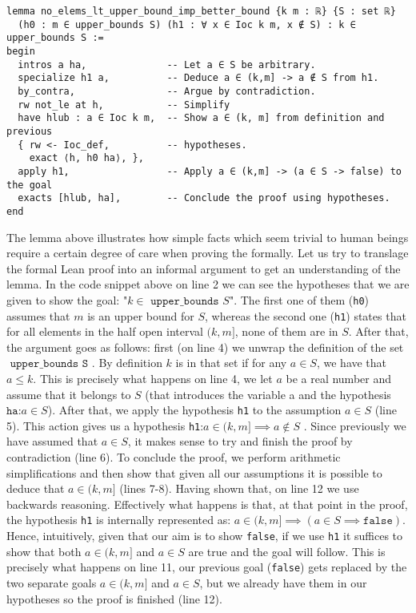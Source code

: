 \documentclass[11pt]{article}
\begin{document}
\begin{verbatim}
lemma no_elems_lt_upper_bound_imp_better_bound {k m : ℝ} {S : set ℝ}
  (h0 : m ∈ upper_bounds S) (h1 : ∀ x ∈ Ioc k m, x ∉ S) : k ∈ upper_bounds S :=
begin
  intros a ha,              -- Let a ∈ S be arbitrary.
  specialize h1 a,          -- Deduce a ∈ (k,m] -> a ∉ S from h1.
  by_contra,                -- Argue by contradiction.
  rw not_le at h,           -- Simplify
  have hlub : a ∈ Ioc k m,  -- Show a ∈ (k, m] from definition and previous
  { rw <- Ioc_def,          -- hypotheses.
    exact ⟨h, h0 ha⟩, },
  apply h1,                 -- Apply a ∈ (k,m] -> (a ∈ S -> false) to the goal
  exacts [hlub, ha],        -- Conclude the proof using hypotheses.
end
\end{verbatim}
The lemma above illustrates how simple facts which seem trivial to human beings
require a certain degree of care when proving the formally. Let us try to
translage the formal Lean proof into an informal argument to get an
understanding of the lemma. In the code snippet above on line 2 we can see the
hypotheses that we are given to show the goal: "$k \in \texttt{ upper\_bounds }
S$". The first one of them (\texttt{h0}) assumes that  $m$ is an upper bound
for  $S$, whereas the second one (\texttt{h1}) states that for all elements in
the half open interval $(k, m]$, none of them are in  $S$. After that, the
argument goes as follows: first (on line 4) we unwrap the definition of the set
$\texttt{ upper\_bounds S }$. By definition $k$ is in that set if for any $a
\in S$, we have that  $a \le k$. This is precisely what happens on line 4, we
let  $a$ be a real number and assume that it belongs to  $S$ (that introduces
the variable a and the hypothesis  $\texttt{ha:} a \in S$). After that, we
apply the hypothesis \texttt{h1} to the assumption $a \in S$ (line 5). This
action gives us a hypothesis \texttt{h1}:$ a \in (k,m] \implies a \not\in S$ .
Since previously we have assumed that $a \in S$, it makes sense to try and
finish the proof by contradiction (line 6). To conclude the proof, we perform
arithmetic simplifications and then show that given all our assumptions it is
possible to deduce that $ a \in (k, m]$ (lines 7-8). Having shown that, on line
12 we use backwards reasoning. Effectively what happens is that, at that point
in the proof, the hypothesis \texttt{h1} is internally represented as: $ a \in
(k,m] \implies (a \in S \implies \texttt{false}) $. Hence, intuitively, given
that our aim is to show \texttt{false}, if we use \texttt{h1} it suffices to
show that both $ a \in (k,m] $ and $a \in S$ are true and the goal will follow.
This is precisely what happens on line 11, our previous goal (\texttt{false})
gets replaced by the two separate goals $ a \in (k,m] $ and $a \in S$, but we
already have them in our hypotheses so the proof is finished (line 12).
\end{document}
